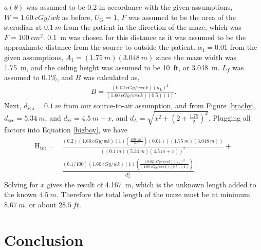 \documentclass[%
aps,
mph,%
amsmath,amssymb,
preprint,%
tightenlines,
longbibliography,
superscriptaddress,
floatfix,
nofootinbib,
]{revtex4-2}
\begin{document}
        $a(\theta)$ was assumed to be 0.2 in accordance with the given assumptions, $W=\qty{1.60}{cGy/wk}$ as before, $U_G = 1$, $F$ was assumed to be the area of the steradian at $\qty{0.1}{m}$ from the patient in the direction of the maze, which was $F = \qty{100}{cm^2}$. \qty{0.1}{m} was chosen for this distance as it was assumed to be the approximate distance from the source to outside the patient. $\alpha_1 = 0.01$ from the given assumptions, $A_1 = (\SI{1.75}{m})(\qty{3.048}{m})$ since the maze width was \qty{1.75}{m}, and the ceiling height was assumed to be \qty{10}{ft}, or \qty{3.048}{m}. $L_f$ was assumed to 0.1\%, and $B$ was calculated as,
        \begin{align}
            B = \frac{\left(\qty{0.02}{cGy/week}\right)\left(d_L\right)^2}{\left(\qty{1.60}{cGy/week}\right)\left(0.5\right)\left( 1 \right)}.
        \end{align}
        Next, $d_\mathrm{sca} = \qty{0.1}{m}$ from our source-to-air assumption, and from Figure \ref{brachy}, $d_\mathrm{sec} = \qty{5.34}{m}$, and $d_\mathrm{zz} = \qty{4.5}{m} + x$, and $d_L = \sqrt{x^2+\left(2+\frac{1.75}{2}\right)^2}$. Plugging all factors into Equation \ref{bigboy}, we have
        \begin{align}
            \mathrm{H_{tot}} =&\frac{\left(0.2\right) \left(\qty{1.60}{cGy/wk}\right)\left(1\right) \left(\frac{\qty{100}{cm^2}}{400}\right)\left(0.01\right) \left((\SI{1.75}{m})(\qty{3.048}{m})\right)}{\left( \left(\qty{0.1}{m}\right)\left(\qty{5.34}{m}\right)\left(\qty{4.5}{m} + x\right) \right)^2} + \nonumber \\ 
            &\frac{\left(0.1/100\right) \left(\qty{1.60}{cGy/wk}\right) \left(1\right) \left( \frac{\left(\qty{0.02}{cGy/week}\right)\left(d_L\right)^2}{\left(\qty{1.60}{cGy/week}\right)\left(0.5\right)\left( 1 \right)} \right)}{d_L^2}. \nonumber
        \end{align}
        Solving for $x$ gives the result of \qty{4.167}{m}, which is the unknown length added to the known $\qty{4.5}{m}$. Therefore the total length of the maze must be at minimum $\qty{8.67}{m}$, or about $\qty{28.5}{ft}$.
    
\section{Conclusion}


\end{document}
